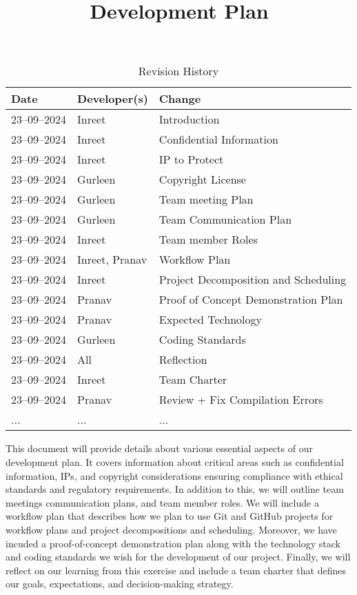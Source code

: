 \documentclass{article}
\title{Development Plan\\\progname}
\author{\authname}
\date{}
\begin{document}
\maketitle

\begin{table}[hp]
\caption{Revision History} \label{TblRevisionHistory}
\begin{tabularx}{\textwidth}{llX}
\toprule
\textbf{Date} & \textbf{Developer(s)} & \textbf{Change}\\
\midrule
23--09--2024 & Inreet & Introduction\\
23--09--2024 & Inreet & Confidential Information\\
23--09--2024 & Inreet & IP to Protect\\
23--09--2024 & Gurleen & Copyright License\\
23--09--2024 & Gurleen & Team meeting Plan\\
23--09--2024 & Gurleen & Team Communication Plan\\
23--09--2024 & Inreet & Team member Roles\\
23--09--2024 & Inreet, Pranav & Workflow Plan\\
23--09--2024 & Inreet & Project Decomposition and Scheduling\\
23--09--2024 & Pranav & Proof of Concept Demonstration Plan\\
23--09--2024 & Pranav & Expected Technology\\
23--09--2024 & Gurleen & Coding Standards\\
23--09--2024 & All & Reflection\\
23--09--2024 & Inreet & Team Charter\\
23--09--2024 & Pranav & Review + Fix Compilation Errors\\
... & ... & ...\\
\bottomrule
\end{tabularx}
\end{table}

\newpage{}

This document will provide details about various essential aspects of our development plan. It covers information about critical areas such as confidential information, IPs, and copyright considerations ensuring compliance with ethical standards and regulatory requirements. In addition to this, we will outline team meetings communication plans, and team member roles. We will include a workflow plan that describes how we plan to use Git and GitHub projects for workflow plans and project decompositions and scheduling. Moreover, we have incuded a proof-of-concept demonstration plan along with the technology stack and coding standards we wish for the development of our project. Finally, we will reflect on our learning from this exercise and include a team charter that defines our goals, expectations, and decision-making strategy. 
\end{document}
